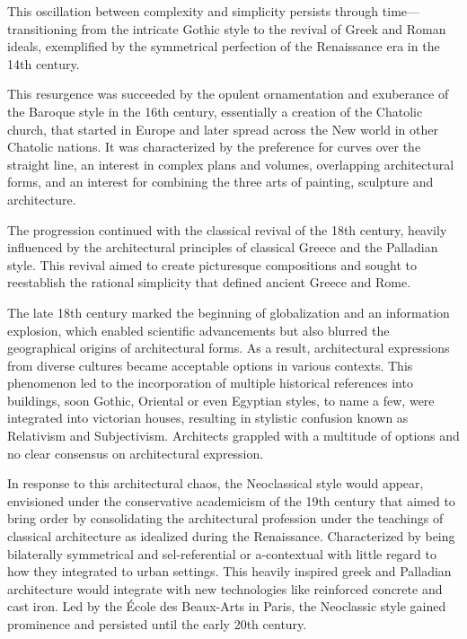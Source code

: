 This oscillation between complexity and simplicity persists through time— transitioning from the intricate Gothic style to the revival of Greek and Roman ideals, exemplified by the symmetrical perfection of the Renaissance era in the 14th century.

This resurgence was succeeded by the opulent ornamentation and exuberance of the Baroque style in the 16th century, essentially a creation of the Chatolic church, that started in Europe and later spread across the New world in other Chatolic nations.
It was characterized by the preference for curves over the straight line, an interest in complex plans and volumes, overlapping architectural forms, and an interest for combining the three arts of painting, sculpture and architecture\cite{Economakis2023}.

The progression continued with the classical revival of the 18th century, heavily influenced by the architectural principles of classical Greece and the Palladian style.
This revival aimed to create picturesque compositions and sought to reestablish the rational simplicity that defined ancient Greece and Rome\cite{Economakis2023}.

The late 18th century marked the beginning of globalization and an information explosion, which enabled scientific advancements but also blurred the geographical origins of architectural forms.
As a result, architectural expressions from diverse cultures became acceptable options in various contexts.
This phenomenon led to the incorporation of multiple historical references into buildings, soon Gothic, Oriental or even Egyptian styles, to name a few, were integrated into victorian houses, resulting in stylistic confusion known as Relativism and Subjectivism.
Architects grappled with a multitude of options and no clear consensus on architectural expression\cite{Economakis2023}.

In response to this architectural chaos, the Neoclassical style would appear, envisioned under the conservative academicism of the 19th century that aimed to bring order by consolidating the architectural profession under the teachings of classical architecture as idealized during the Renaissance.
Characterized by being bilaterally symmetrical and sel-referential or a-contextual with little regard to how they integrated to urban settings.
This heavily inspired greek and Palladian architecture would integrate with new technologies like reinforced concrete and cast iron.
Led by the École des Beaux-Arts in Paris, the Neoclassic style gained prominence and persisted until the early 20th century\cite{Economakis2023}.

